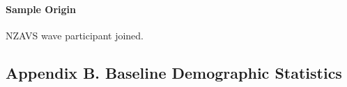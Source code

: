 \documentclass[
  singlecolumn]{article}
\let\oldparagraph\paragraph
\renewcommand{\paragraph}[1]{\oldparagraph{#1}\mbox{}}
\begin{document}
\paragraph{Sample Origin}\label{sample-origin}

NZAVS wave participant joined.

\subsection{Appendix B. Baseline Demographic
Statistics}\label{appendix-demographics}

\begin{table}

\caption{\label{tbl-B}}

\centering{

\captionsetup{labelsep=none}

}

\end{table}%
\end{document}
